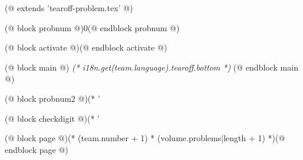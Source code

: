 (@ extends 'tearoff-problem.tex' @)

(@ block probnum @)0(@ endblock probnum @)

(@ block activate @)(@ endblock activate @)

(@ block main @)
    \centering
    \vspace*{37mm}
    \LARGE
    \textit{(* i18n.get(team.language).tearoff.bottom *)}
(@ endblock main @)

(@ block probnum2 @)(* '%

(@ block checkdigit @)(* '%

(@ block page @)(* (team.number + 1) * (volume.problems|length + 1) *)(@ endblock page @)
